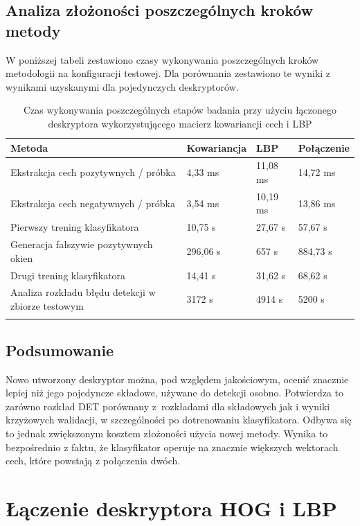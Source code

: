 \subsection{Analiza złożoności poszczególnych kroków metody}

W poniższej tabeli zestawiono czasy wykonywania poszczególnych kroków metodologii na konfiguracji testowej.
Dla porównania zestawiono te wyniki z wynikami uzyskanymi dla pojedynczych deskryptorów.

\begin{center}
    \begin{longtable}{ | p{5cm} | p{3cm} | p{3cm} | p{3cm} |}
    \hline
	Metoda & Kowariancja & LBP & Połączenie \\ \hline
    Ekstrakcja cech pozytywnych / próbka & 4,33 ms & 11,08 ms & 14,72 ms \\ \hline
    Ekstrakcja cech negatywnych / próbka & 3,54 ms & 10,19 ms & 13,86 ms\\ \hline
    Pierwszy trening klasyfikatora & 10,75 s & 27,67 s & 57,67 s \\ \hline
    Generacja fałszywie pozytywnych okien & 296,06 s & 657 s & 884,73 s \\ \hline
    Drugi trening klasyfikatora & 14,41 s & 31,62 s & 68,62 s \\ \hline
    Analiza rozkładu błędu detekcji w zbiorze testowym & 3172 s & 4914 s & 5200 s \\ \hline
    \caption{Czas wykonywania poszczególnych etapów badania przy użyciu łączonego deskryptora wykorzystującego macierz kowariancji cech i LBP} \\
    \end{longtable}
\end{center}

\subsection{Podsumowanie}

Nowo utworzony deskryptor można, pod względem jakościowym, ocenić znacznie lepiej niż jego pojedyncze składowe, używane do detekcji osobno. Potwierdza to zarówno rozkład DET porównany z~rozkładami dla składowych jak i wyniki krzyżowych walidacji, w szczególności po dotrenowaniu klasyfikatora. Odbywa się to jednak zwiększonym kosztem złożoności użycia nowej metody. Wynika to bezpośrednio z faktu, że klasyfikator operuje na znacznie większych wektorach cech, które powstają z połączenia dwóch.


\section{Łączenie deskryptora HOG i LBP}

